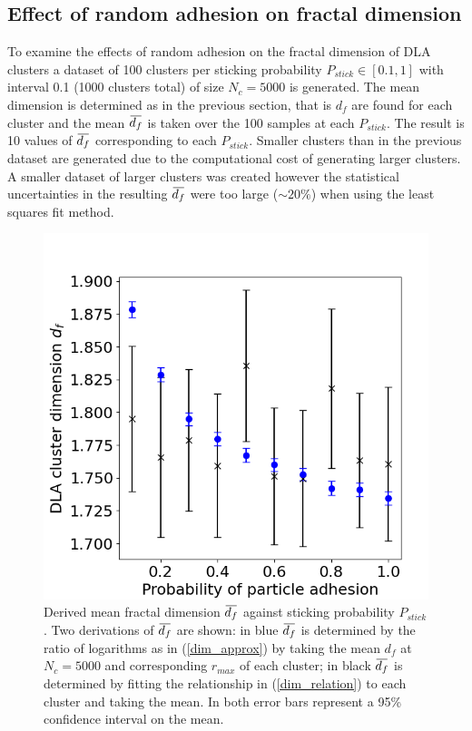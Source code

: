 \documentclass[10pt, twocolumn]{article} %
\newcommand{\overbar}[1]{\mkern 1.5mu\overline{\mkern-1.5mu#1\mkern-1.5mu}\mkern 1.5mu}
\begin{document}
\subsection*{Effect of random adhesion on fractal dimension}
To examine the effects of random adhesion on the fractal dimension of DLA clusters a dataset of 100 clusters per sticking probability $P_{stick}\in[0.1, 1]$ with interval 0.1 (1000 clusters total) of size $N_c = 5000$ is generated. The mean dimension is determined as in the previous section, that is $d_f$ are found for each cluster and the mean $\overbar{d_f}$ is taken over the 100 samples at each $P_{stick}$. The result is 10 values of $\overbar{d_f}$ corresponding to each $P_{stick}$. Smaller clusters than in the previous dataset are generated due to the computational cost of generating larger clusters. A smaller dataset of larger clusters was created however the statistical uncertainties in the resulting $\overbar{d_f}$ were too large ($\sim 20\%$) when using the least squares fit method.

\begin{figure}[t]
\centering
\includegraphics[width=0.95\columnwidth]{stick_dims_together.png}
  \caption{
    Derived mean fractal dimension $\overbar{d_f}$ against sticking probability $P_{stick}$. Two derivations of $\overbar{d_f}$ are shown: in blue $\overbar{d_f}$ is determined by the ratio of logarithms as in (\ref{dim_approx}) by taking the mean $d_f$ at $N_c=5000$ and corresponding $r_{max}$ of each cluster; in black $\overbar{d_f}$ is determined by fitting the relationship in (\ref{dim_relation}) to each cluster and taking the mean. In both error bars represent a 95\% confidence interval on the mean.
  }
  \label{stick_dims_together}
\end{figure}
\end{document}
